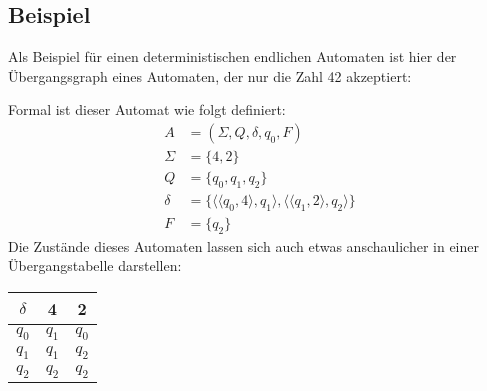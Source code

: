 \subsection{Beispiel}
\label{sec:Beispiel}
\begin{flushleft}
    Als Beispiel für einen deterministischen endlichen Automaten ist hier der Übergangsgraph eines
    Automaten, der nur die Zahl 42 akzeptiert:
\end{flushleft}
    
\begin{center}
\end{center}

\begin{flushleft}
    Formal ist dieser Automat wie folgt definiert:
    \begin{align}
        A &= (\Sigma,Q,\delta,q_0,F) \\
        \Sigma &= \{4,2\} \\
        Q &= \{q_0,q_1,q_2\} \\
        \delta &= \{\langle \langle q_0, 4 \rangle, q_1 \rangle, \langle \langle q_1, 2 \rangle, q_2 \rangle \} \\
        F &= \{q_2\}
    \end{align}
    Die Zustände dieses Automaten lassen sich auch etwas anschaulicher in einer Übergangstabelle darstellen:
\end{flushleft}

\begin{center}
\begin{tabular}{|c|c|c|}
    \hline
    $\delta$ & 4 & 2 \\
    \hline
    $q_0$ & $q_1$ & $q_0$ \\
    \hline
    $q_1$ & $q_1$ & $q_2$ \\
    \hline
    $q_2$ & $q_2$ & $q_2$ \\
    \hline
\end{tabular}
\end{center}

